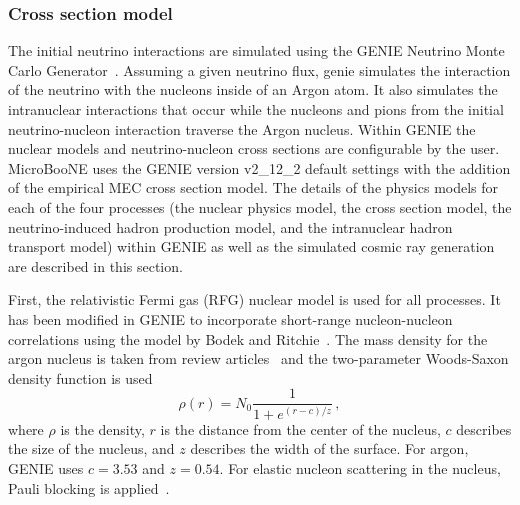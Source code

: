   \subsubsection{Cross section model}\label{sec:geniexsec}
    The initial neutrino interactions are simulated using the GENIE Neutrino
    Monte Carlo Generator~\cite{Andreopoulos:2009rq,Andreopoulos:2015wxa}.
    Assuming a given neutrino flux, genie simulates the interaction of the
    neutrino with the nucleons inside of an Argon atom. It also simulates the
    intranuclear interactions that occur while the nucleons and pions from the
    initial neutrino-nucleon interaction traverse the Argon nucleus.  Within
    GENIE the nuclear models and neutrino-nucleon cross sections are
    configurable by the user.  MicroBooNE uses the GENIE version v2\_12\_2
    default settings with the addition of the empirical MEC cross section
    model. The details of the physics models for each of the four processes
    (the nuclear physics model, the cross section model, the neutrino-induced
    hadron production model, and the intranuclear hadron transport model)
    within GENIE as well as the simulated cosmic ray generation are described
    in this section.

    First, the relativistic Fermi gas (RFG) nuclear model is used for all
    processes. It has been modified in GENIE to incorporate short-range
    nucleon-nucleon correlations using the model by Bodek and
    Ritchie~\cite{BodekrRitchie}. The mass density for the argon nucleus is
    taken from review articles~\cite{nucdensity} and the two-parameter
    Woods-Saxon density function is used~\cite{WoodsSaxon}
    \begin{equation}\label{eq:woodssaxon}
      \rho(r) = N_0\frac{1}{1+e^{(r-c)/z}} \,,
    \end{equation}
    where $\rho$ is the density, $r$ is the distance from the center of the
    nucleus, $c$ describes the size of the nucleus, and $z$ describes the width
    of the surface. For argon, GENIE uses $c=3.53$ and $z=0.54$.  For elastic
    nucleon scattering in the nucleus, Pauli blocking is
    applied~\cite{PauliBlock}.
    
